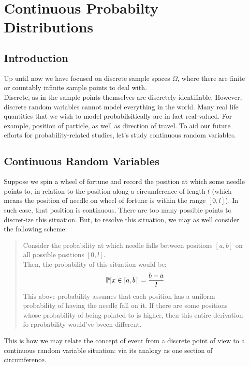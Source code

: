 \chapter{Continuous Probabilty Distributions}

\section{Introduction}
Up until now we have focused on discrete sample spaces $\Omega$, where there are finite or countably infinite sample points to deal with. \\
Discrete, as in the sample points themselves are discretely identifiable. However, discrete random variables cannot model everything in the world.
Many real life quantities that we wish to model probabilsitically are in fact real-valued. For example, position of particle, as well as direction of travel.
To aid our future efforts for probability-related studies, let's study continuous random variables.

\section{Continuous Random Variables}
Suppose we spin a wheel of fortune and record the position at which some needle points to, in relation to the position along a circumference of length $l$ (which means the position of needle on wheel of fortune is within the range $[0, l]$).
In such case, that position is continuous. There are too many possible points to discret-ize this situation. But, to resolve this situation, we may as well consider the following scheme:
\begin{quote}
    Consider the probability at which needle falls between positions $[a, b]$ on all possible positions $[0, l]$. \\
    Then, the probability of this situation would be:
    \[
        \P[x \in [a, b]] = \frac{b - a}{l}
    \]
    This above probability assumes that each position has a uniform probability of having the needle fall on it. If there are some positions whose probability of being pointed to is higher, then this entire derivation fo rprobability would've bveen different.
\end{quote}
This is how we may relate the concept of event from a discrete point of view to a continuous random variable situation: via its analogy as one section of circumference.

